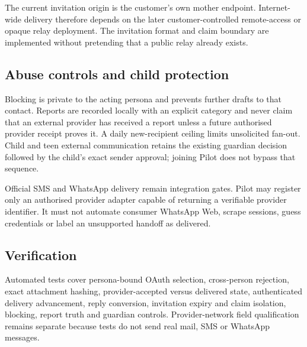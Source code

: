 The current invitation origin is the customer's own mother endpoint.  Internet-wide
delivery therefore depends on the later customer-controlled remote-access or opaque
relay deployment.  The invitation format and claim boundary are implemented without
pretending that a public relay already exists.

\subsection{Abuse controls and child protection}

Blocking is private to the acting persona and prevents further drafts to that contact.
Reports are recorded locally with an explicit category and never claim that an
external provider has received a report unless a future authorised provider receipt
proves it.  A daily new-recipient ceiling limits unsolicited fan-out.  Child and teen
external communication retains the existing guardian decision followed by the
child's exact sender approval; joining Pilot does not bypass that sequence.

Official SMS and WhatsApp delivery remain integration gates.  Pilot may register only
an authorised provider adapter capable of returning a verifiable provider identifier.
It must not automate consumer WhatsApp Web, scrape sessions, guess credentials or
label an unsupported handoff as delivered.

\subsection{Verification}

Automated tests cover persona-bound OAuth selection, cross-person rejection, exact
attachment hashing, provider-accepted versus delivered state, authenticated delivery
advancement, reply conversion, invitation expiry and claim isolation, blocking,
report truth and guardian controls.  Provider-network field qualification remains
separate because tests do not send real mail, SMS or WhatsApp messages.
